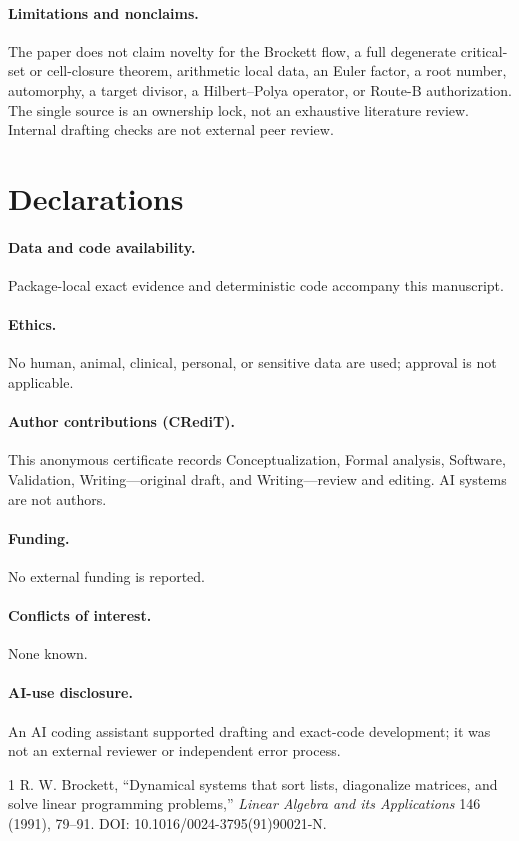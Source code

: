 \documentclass[9pt]{extarticle}
\begin{document}
\paragraph{Limitations and nonclaims.}
The paper does not claim novelty for the Brockett flow, a full degenerate
critical-set or cell-closure theorem, arithmetic local data, an Euler factor,
a root number, automorphy, a target divisor, a Hilbert--Polya operator, or
Route-B authorization.  The single source is an ownership lock, not an
exhaustive literature review.  Internal drafting checks are not external peer
review.

\section*{Declarations}
\paragraph{Data and code availability.} Package-local exact evidence and
deterministic code accompany this manuscript.
\paragraph{Ethics.} No human, animal, clinical, personal, or sensitive data
are used; approval is not applicable.
\paragraph{Author contributions (CRediT).} This anonymous certificate records
Conceptualization, Formal analysis, Software, Validation, Writing---original
draft, and Writing---review and editing.  AI systems are not authors.
\paragraph{Funding.} No external funding is reported.
\paragraph{Conflicts of interest.} None known.
\paragraph{AI-use disclosure.} An AI coding assistant supported drafting and
exact-code development; it was not an external reviewer or independent error
process.

\begin{thebibliography}{1}
 R. W. Brockett,
``Dynamical systems that sort lists, diagonalize matrices, and solve linear
programming problems,'' \emph{Linear Algebra and its Applications} 146 (1991),
79--91. DOI: 10.1016/0024-3795(91)90021-N.
\end{thebibliography}
\end{document}
